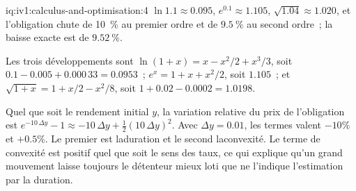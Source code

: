 \begin{solution}{iq:iv1:calculus-and-optimisation:4}
$\ln 1.1 \approx 0.095$, $e^{0.1} \approx 1.105$, $\sqrt{1.04} \approx 1.020$, et l'obligation chute de 10~\% au premier ordre et de $9.5~\%$ au second ordre~; la baisse exacte est de $9.52~\%$.

Les trois développements sont $\ln(1 + x) = x - x^2/2 + x^3/3$, soit $0.1 - 0.005 + 0.000\,33 = 0.0953$~; $e^x = 1 + x + x^2/2$, soit $1.105$~; et $\sqrt{1 + x} = 1 + x/2 - x^2/8$, soit $1 + 0.02 - 0.0002 = 1.0198$.

Quel que soit le rendement initial $y$, la variation relative du prix de l'obligation est $e^{-10\,\Delta y} - 1 \approx -10\,\Delta y + \frac12(10\,\Delta y)^2$. Avec $\Delta y = 0.01$, les termes valent $-10\%$ et $+0.5\%$. Le premier est laduration et le second laconvexité. Le terme de convexité est positif quel que soit le sens des taux, ce qui explique qu'un grand mouvement laisse toujours le détenteur mieux loti que ne l'indique l'estimation par la duration.



\end{solution}

